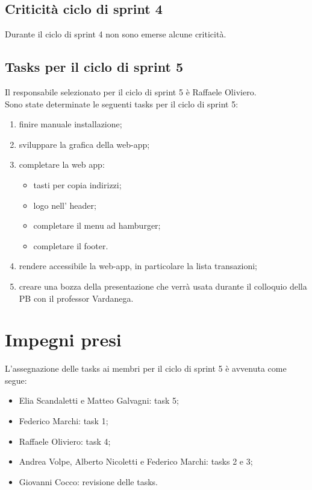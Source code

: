 \documentclass[a4paper, 12pt]{article}
\begin{document}
\subsection{Criticità ciclo di sprint 4}
Durante il ciclo di sprint 4 non sono emerse alcune criticità.


\subsection{Tasks per il ciclo di sprint 5}
Il responsabile selezionato per il ciclo di sprint 5 è Raffaele Oliviero. \\
Sono state determinate le seguenti tasks per il ciclo di sprint 5:
\begin{enumerate}
	\item finire manuale installazione;
	\item sviluppare la grafica della web-app;
	\item completare la web app:
	    \begin{itemize}
	        \item tasti per copia indirizzi;
            \item logo nell' header;
            \item completare il menu ad hamburger;
            \item completare il footer.
	    \end{itemize}
	\item rendere accessibile la web-app, in particolare la lista transazioni;
	\item creare una bozza della presentazione che verrà usata durante il colloquio della PB con il professor Vardanega.
\end{enumerate}

\section{Impegni presi}
L'assegnazione delle tasks ai membri per il ciclo di sprint 5 è avvenuta come segue:
\begin{itemize}
	\item Elia Scandaletti e Matteo Galvagni: task 5;
	\item Federico Marchi: task 1;
	\item Raffaele Oliviero: task 4;
	\item Andrea Volpe, Alberto Nicoletti e Federico Marchi: tasks 2 e 3;
	\item Giovanni Cocco: revisione delle tasks.
\end{itemize}
\end{document}
